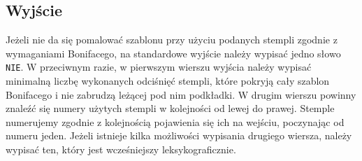 \documentclass[zad,zawodnik,utf8]{sinol}
\begin{document}
\begin{tasktext}
  \section{Wyjście}
Jeżeli nie da się pomalować szablonu przy użyciu podanych stempli zgodnie z wymaganiami Bonifacego,
na standardowe wyjście należy wypisać jedno słowo \texttt{NIE}. W przeciwnym razie,
w pierwszym wierszu wyjścia należy wypisać minimalną liczbę wykonanych odciśnięć stempli, które pokryją
cały szablon Bonifacego i nie zabrudzą leżącej pod nim podkładki. W drugim wierszu powinny znaleźć się
numery użytych stempli w kolejności od lewej do prawej. Stemple numerujemy zgodnie z kolejnością pojawienia
się ich na wejściu, poczynając od numeru jeden. Jeżeli istnieje kilka możliwości wypisania drugiego wiersza,
należy wypisać ten, który jest wcześniejszy leksykograficznie.
     \makecompactexample

  \end{tasktext}
\end{document}
